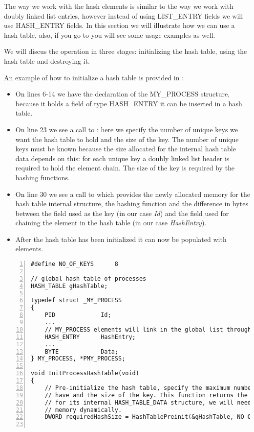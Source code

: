 \begin{appendices}
The way we work with the hash elements is similar to the way we work with doubly linked list entries,
however instead of using LIST\_ENTRY fields we will use HASH\_ENTRY fields. In this section we will
illustrate how we can use a hash table, also, if you go to  you will
see some usage examples as well.

We will discus the operation in three stages: initializing the hash table, using the hash table and
destroying it.

An example of how to initialize a hash table is provided in :
\begin{itemize}
	\item On lines 6-14 we have the declaration of the MY\_PROCESS structure, because it holds a
	field of type HASH\_ENTRY it can be inserted in a hash table.
	
	\item On line 23 we see a call to : here we specify the number of unique
	keys we want the hash table to hold and the size of the key. The number of unique keys must be
	known because the size allocated for the internal hash table data depends on this: for each
	unique key a doubly linked list header is required to hold the element chain. The size of the
	key is required by the hashing functions.
	
	\item On line 30 we see a call to  which provides the newly allocated
	memory for the hash table internal structure, the hashing function and the difference in bytes
	between the field used as the key (in our case \textit{Id}) and the field used for chaining the
	element in the hash table (in our case \textit{HashEntry}).
	
	\item After the hash table has been initialized it can now be populated with elements.
\end{itemize}

\begin{lstlisting}[caption={Hash Initialization Example},label={lst:HashInitEg},numbers=left]
#define NO_OF_KEYS		8

// global hash table of processes
HASH_TABLE gHashTable;

typedef struct _MY_PROCESS
{
	PID 			Id;
	...
	// MY_PROCESS elements will link in the global list through the HashEntry field
	HASH_ENTRY		HashEntry;
	...
	BYTE			Data;
} MY_PROCESS, *PMY_PROCESS;

void InitProcessHashTable(void)
{
	// Pre-initialize the hash table, specify the maximum number of keys we want it to 
	// have and the size of the key. This function returns the size in bytes required
	// for its internal HASH_TABLE_DATA structure, we will need to allocate this
	// memory dynamically.
	DWORD requiredHashSize = HashTablePreinit(&gHashTable, NO_OF_KEYS, sizeof(PID));
	

\end{lstlisting}
\end{appendices}
